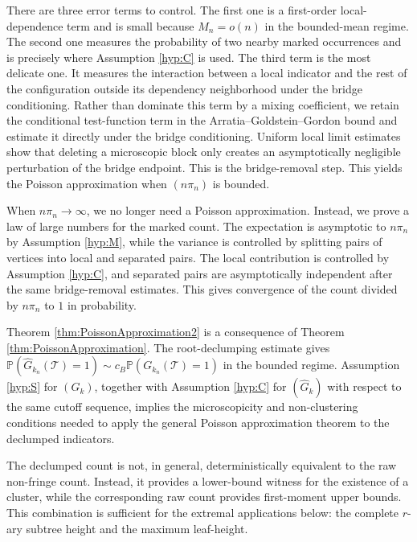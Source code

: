 \documentclass[a4paper,11pt]{article}
\DeclareRobustCommand{\P}{\mathbb{P}}
\DeclareRobustCommand{\1}{\mathbf{1}}
\begin{document}
There are three error terms to control. The first one is a first-order
local-dependence term and is small because $M_n=o(n)$ in the bounded-mean
regime. The second one measures the probability of two nearby marked
occurrences and is precisely where Assumption \ref{hyp:C} is used. The third
term is the most delicate one. It measures the interaction between a local
indicator and the rest of the configuration outside its dependency
neighborhood under the bridge conditioning. Rather than dominate this term by a mixing coefficient, we retain the
conditional test-function term in the Arratia--Goldstein--Gordon bound and
estimate it directly under the bridge conditioning. Uniform local limit estimates show that deleting a microscopic block only
creates an asymptotically negligible perturbation of the bridge endpoint.
This is the bridge-removal step. This
yields the Poisson approximation when $(n\pi_n)$ is bounded.

When $n\pi_n\to\infty$, we no longer need a Poisson approximation. Instead, we
prove a law of large numbers for the marked count. The expectation is
asymptotic to $n\pi_n$ by Assumption \ref{hyp:M}, while the variance is
controlled by splitting pairs of vertices into local and separated pairs. The
local contribution is controlled by Assumption \ref{hyp:C}, and separated
pairs are asymptotically independent after the same bridge-removal estimates.
This gives convergence of the count divided by $n\pi_n$ to $1$ in probability.

Theorem \ref{thm:PoissonApproximation2} is a consequence of Theorem
\ref{thm:PoissonApproximation}. The root-declumping estimate gives
$\P(\widehat G_{k_n}(\mathcal T)=1)\sim c_B\P(G_{k_n}(\mathcal T)=1)$ in the
bounded regime.  Assumption \ref{hyp:S} for $(G_k)$, together with Assumption \ref{hyp:C}
for $(\widehat G_k)$ with respect to the same cutoff sequence, implies the
microscopicity and non-clustering conditions needed to apply the general
Poisson approximation theorem to the declumped indicators.

The declumped count is not, in general, deterministically equivalent to the
raw non-fringe count. Instead, it provides a lower-bound witness for the
existence of a cluster, while the corresponding raw count provides first-moment
upper bounds. This combination is sufficient for the extremal applications
below: the complete $r$-ary subtree height and the maximum leaf-height.
\end{document}
